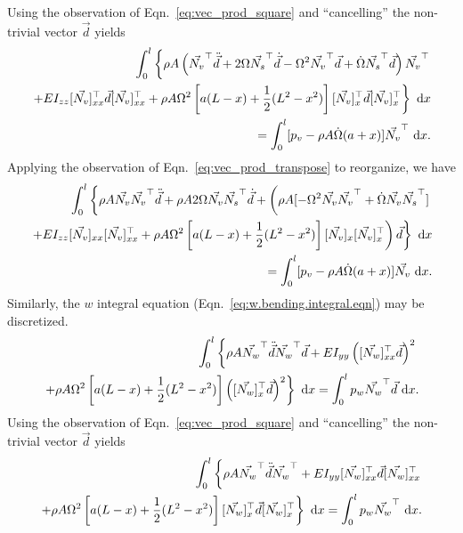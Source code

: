 Using the observation of Eqn.~\ref{eq:vec_prod_square} and ``cancelling'' the non-trivial vector $\vec d$ yields
\begin{eqnarray}
\int_0^l\left\lbrace\rho A\left(\vec{N_v}^\top\ddot{\vec d} + 2\Omega\vec{N_s}^\top\dot{\vec d}-\Omega^2\vec{N_v}^\top\vec{d}+\dot\Omega \vec{N_s}^\top\vec{d}\right)\vec{N_v}^\top\vphantom{\frac{0}{0}}\right.\nonumber \\
\left.+EI_{zz}[\vec{N_v}]_{xx}^\top\vec{d}[\vec{N_v}]_{xx}^\top+\rho A\Omega^2\left[a(L-x)+\frac{1}{2}(L^2-x^2)\right][\vec{N_v}]_{x}^\top\vec{d}[\vec{N_v}]_{x}^\top\right\rbrace\text{ d}x \\
= \int_0^l[p_v - \rho A\dot\Omega(a+x)]\vec{N_v}^\top\text{ d}x. \nonumber
\end{eqnarray}
Applying the observation of Eqn.~\ref{eq:vec_prod_transpose} to reorganize, we have
\begin{eqnarray}
\label{eq:v.disc.final}
\int_0^l\left\lbrace\rho A\vec{N_v}\vec{N_v}^\top\ddot{\vec d} + \rho A 2\Omega\vec{N_v}\vec{N_s}^\top\dot{\vec d}+\left(\rho A[-\Omega^2\vec{N_v}\vec{N_v}^\top+\dot\Omega \vec{N_v}\vec{N_s}^\top]\vphantom{\frac{0}{0}}\right.\right.\nonumber \\
\left.\left.+EI_{zz}[\vec{N_v}]_{xx}[\vec{N_v}]_{xx}^\top+\rho A\Omega^2\left[a(L-x)+\frac{1}{2}(L^2-x^2)\right][\vec{N_v}]_{x}[\vec{N_v}]_{x}^\top\right)\vec{d}\right\rbrace\text{ d}x \\
= \int_0^l[p_v - \rho A\dot\Omega(a+x)]\vec{N_v}\text{ d}x. \nonumber
\end{eqnarray}
Similarly, the $w$ integral equation (Eqn.~\ref{eq:w.bending.integral.eqn}) may be discretized.
\begin{eqnarray}
\int_0^l\left\lbrace\rho A\vec{N_w}^\top\ddot{\vec{d}}\vec{N_w}^\top\vec{d}+EI_{yy}\left([\vec{N_w}]_{xx}^\top\vec{d}\right)^2\vphantom{\frac{0}{0}}\right.  \\
\left.+\rho A\Omega^2\left[a(L-x)+\frac{1}{2}(L^2-x^2)\right]\left([\vec{N_w}]_{x}^\top\vec{d}\right)^2\right\rbrace\text{ d}x 
= \int_0^lp_w\vec{N_w}^\top\vec{d}\text{ d}x. \nonumber 
\end{eqnarray}
Using the observation of Eqn.~\ref{eq:vec_prod_square} and ``cancelling'' the non-trivial vector $\vec d$ yields
\begin{eqnarray}
\int_0^l\left\lbrace\rho A\vec{N_w}^\top\ddot{\vec{d}}\vec{N_w}^\top+EI_{yy}[\vec{N_w}]_{xx}^\top\vec{d}[\vec{N_w}]_{xx}^\top\vphantom{\frac{0}{0}}\right.  \\
\left.+\rho A\Omega^2\left[a(L-x)+\frac{1}{2}(L^2-x^2)\right][\vec{N_w}]_{x}^\top\vec{d}[\vec{N_w}]_{x}^\top\right\rbrace\text{ d}x 
= \int_0^lp_w\vec{N_w}^\top\text{ d}x. \nonumber 
\end{eqnarray}
